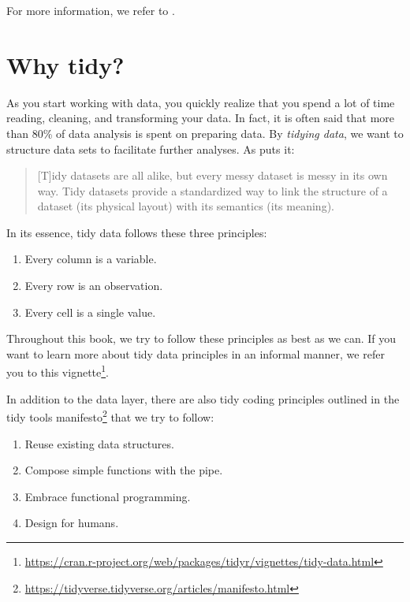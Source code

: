\documentclass[
]{book}
\providecommand{\tightlist}{%
  \setlength{\itemsep}{0pt}\setlength{\parskip}{0pt}}
\renewcommand{\href}[2]{#2\footnote{\url{#1}}}
\begin{document}
For more information, we refer to \citet{Wickham2019}.

\hypertarget{why-tidy}{%
\section*{Why tidy?}\label{why-tidy}}


As you start working with data, you quickly realize that you spend a lot of time reading, cleaning, and transforming your data. In fact, it is often said that more than 80\% of data analysis is spent on preparing data. By \emph{tidying data}, we want to structure data sets to facilitate further analyses. As \citet{Wickham2014} puts it:

\begin{quote}
{[}T{]}idy datasets are all alike, but every messy dataset is messy in its own way. Tidy datasets provide a standardized way to link the structure of a dataset (its physical layout) with its semantics (its meaning).
\end{quote}

In its essence, tidy data follows these three principles:

\begin{enumerate}
\def\labelenumi{\arabic{enumi}.}
\tightlist
\item
  Every column is a variable.
\item
  Every row is an observation.
\item
  Every cell is a single value.
\end{enumerate}

Throughout this book, we try to follow these principles as best as we can. If you want to learn more about tidy data principles in an informal manner, we refer you to \href{https://cran.r-project.org/web/packages/tidyr/vignettes/tidy-data.html}{this vignette}.

In addition to the data layer, there are also tidy coding principles outlined in \href{https://tidyverse.tidyverse.org/articles/manifesto.html}{the tidy tools manifesto} that we try to follow:

\begin{enumerate}
\def\labelenumi{\arabic{enumi}.}
\tightlist
\item
  Reuse existing data structures.
\item
  Compose simple functions with the pipe.
\item
  Embrace functional programming.
\item
  Design for humans.
\end{enumerate}
\end{document}
